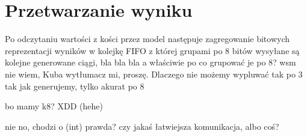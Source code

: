 \chapter{Przetwarzanie wyniku}

Po odczytaniu wartości z kości przez model następuje zagregowanie bitowych reprezentacji wyników w kolejkę FIFO z której grupami po 8 bitów wysyłane są kolejne generowane ciągi, bla bla bla
a właściwie po co grupować je po 8?
wsm nie wiem, Kuba wytłumacz mi, proszę.
Dlaczego nie możemy wypluwać tak po 3 tak jak generujemy, tylko akurat po 8

bo mamy k8? XDD
(hehe)

nie no, chodzi o (int) prawda? czy jakaś łatwiejsza komunikacja, albo coś?